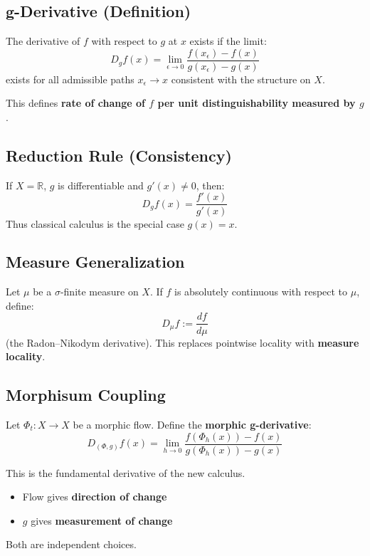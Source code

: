 \documentclass[12pt, oneside]{article}
\begin{document}
\subsection{g-Derivative (Definition)}

The derivative of $f$ with respect to $g$ at $x$ exists if the limit:
\begin{equation}
D_g f(x) = \lim_{\epsilon \to 0} \frac{f(x_\epsilon) - f(x)}{g(x_\epsilon) - g(x)}
\end{equation}
exists for all admissible paths $x_\epsilon \to x$ consistent with the structure on $X$.

This defines \textbf{rate of change of $f$ per unit distinguishability measured by $g$}.

\subsection{Reduction Rule (Consistency)}

If $X = \mathbb{R}$, $g$ is differentiable and $g'(x) \neq 0$, then:
\begin{equation}
D_g f(x) = \frac{f'(x)}{g'(x)}
\end{equation}
Thus classical calculus is the special case $g(x) = x$.

\subsection{Measure Generalization}

Let $\mu$ be a $\sigma$-finite measure on $X$. If $f$ is absolutely continuous with respect to $\mu$, define:
\begin{equation}
D_\mu f := \frac{df}{d\mu}
\end{equation}
(the Radon--Nikodym derivative). This replaces pointwise locality with \textbf{measure locality}.

\subsection{Morphisum Coupling}

Let $\Phi_t: X \rightarrow X$ be a morphic flow. Define the \textbf{morphic g-derivative}:
\begin{equation}
D_{(\Phi,g)} f(x) = \lim_{h \to 0} \frac{f(\Phi_h(x)) - f(x)}{g(\Phi_h(x)) - g(x)}
\end{equation}

This is the fundamental derivative of the new calculus.
\begin{itemize}
    \item Flow gives \textbf{direction of change}
    \item $g$ gives \textbf{measurement of change}
\end{itemize}
Both are independent choices.
\end{document}
